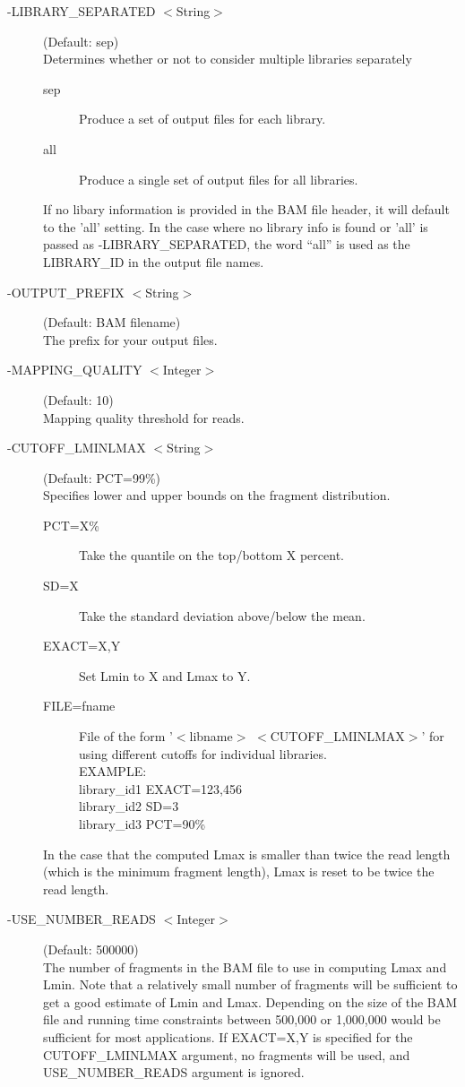 \documentclass[11pt]{article}
\begin{document}
\begin{description}
\item[-LIBRARY\_SEPARATED $<$String$>$] (Default: sep)\\
Determines whether or not to consider multiple libraries separately
\begin{description}
\item[sep] Produce a set of output files for each library.
\item[all] Produce a single set of output files for all libraries.
\end{description}
If no libary information is provided in the BAM file header, it will default to the 'all' setting. In the case where no library info is found or 'all' is passed as -LIBRARY\_SEPARATED, the word ``all'' is used as the LIBRARY\_ID in the output file names.

\item[-OUTPUT\_PREFIX $<$String$>$] (Default: BAM filename)\\
The prefix for your output files.

\item[-MAPPING\_QUALITY $<$Integer$>$] (Default: 10) \\
Mapping quality threshold for reads.

\item[-CUTOFF\_LMINLMAX $<$String$>$] (Default: PCT=99\%)\\
Specifies lower and upper bounds on the fragment distribution.
\begin{description}
\item[PCT=X\%] Take the quantile on the top/bottom X percent. 
\item[SD=X] Take the standard deviation above/below the mean.
\item[EXACT=X,Y] Set Lmin to X and Lmax to Y.
\item[FILE=fname] File of the form '$<$libname$>$ $<$CUTOFF\_LMINLMAX$>$' for using different cutoffs for individual libraries.\\
\noindent EXAMPLE: \\
\noindent library\_id1 EXACT=123,456\\
\noindent library\_id2 SD=3\\
\noindent library\_id3 PCT=90\%
\end{description}
In the case that the computed Lmax is smaller than twice the read length (which is the minimum fragment length), Lmax is reset to be twice the read length.

\item[-USE\_NUMBER\_READS $<$Integer$>$] (Default: 500000)\\
The number of fragments in the BAM file to use in computing Lmax and Lmin. Note that a relatively small number of fragments will be sufficient to get a good estimate of Lmin and Lmax.
Depending on the size of the BAM file and running time
constraints between 500,000 or 1,000,000 would be
sufficient for most applications. If EXACT=X,Y is 
specified for the CUTOFF\_LMINLMAX argument, no fragments
will be used, and USE\_NUMBER\_READS argument is ignored. 


\end{description}
\end{document}
